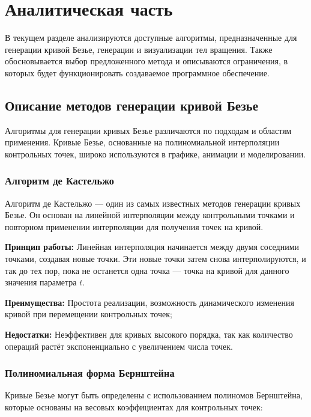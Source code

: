 \chapter{Аналитическая часть}

В текущем разделе анализируются доступные алгоритмы, предназначенные для генерации кривой Безье, генерации и визуализации тел вращения. Также обосновывается выбор предложенного метода и описываются ограничения, в которых будет функционировать создаваемое программное обеспечение.

\section{Описание методов генерации кривой Безье}

Алгоритмы для генерации кривых Безье различаются по подходам и областям применения. Кривые Безье, основанные на полиномиальной интерполяции контрольных точек, широко используются в графике, анимации и моделировании.

\subsection{Алгоритм де Кастельжо}

Алгоритм де Кастельжо — один из самых известных методов генерации кривых Безье. Он основан на линейной интерполяции между контрольными точками и повторном применении интерполяции для получения точек на кривой.

\textbf{Принцип работы:} Линейная интерполяция начинается между двумя соседними точками, создавая новые точки. Эти новые точки затем снова интерполируются, и так до тех пор, пока не останется одна точка — точка на кривой для данного значения параметра $t$.

\textbf{Преимущества:} Простота реализации, возможность динамического изменения кривой при перемещении контрольных точек;

\textbf{Недостатки:} Неэффективен для кривых высокого порядка, так как количество операций растёт экспоненциально с увеличением числа точек.

\subsection{Полиномиальная форма Бернштейна}

Кривые Безье могут быть определены с использованием полиномов Бернштейна, которые основаны на весовых коэффициентах для контрольных точек:

